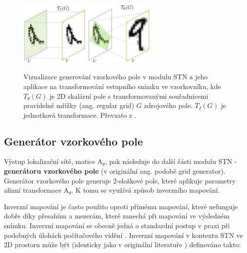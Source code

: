 \begin{figure}[h]
\centering
\includegraphics[width=0.3\textwidth,keepaspectratio]{Figures/stn/stn_a.png}
\includegraphics[width=0.3\textwidth,keepaspectratio]{Figures/stn/stn_b.png}
\caption[Vizualizace generování vzorkového pole v modulu STN]
{Vizualizace generování vzorkového pole v modulu STN a jeho aplikace na transformování vstupního snímku ve vzorkovníku, kde $T_{\theta}(G)$ je 2D skalární pole s transformovanými souřadnicemi pravidelné mřížky (ang. regular grid) $G$ zdrojového pole. $T_{I}(G)$ je jednotková transformace. Převzato z \cite{stn}. }
\label{fig:stn_grid}
\end{figure}

\subsection{Generátor vzorkového pole}

Výstup lokalizační sítě, matice ${\displaystyle \mathrm {A} }_\theta$, pak následuje do další části modulu STN - \textbf{generátoru vzorkového pole} (v originální ang. podobě grid generator). Generátor vzorkového pole generuje 2-složkové pole, které aplikuje parametry afinní transformace ${\displaystyle \mathrm {A} }_\theta$. K tomu se využívá způsob inverzního mapování.

Inverzní mapování je často použito oproti přímému mapování, které nefunguje dobře díky přesahům a mezerám, které zanechá při mapování ve výsledném snímku. Inverzní mapování se obecně jedná o standardní postup v praxi při podobných úlohách počítačového vidění \cite{stn_medium_1}. Inverzní mapování v kontextu STN ve 2D prostoru může být (identicky jako v originální literatuře \cite{stn}) definováno takto:

